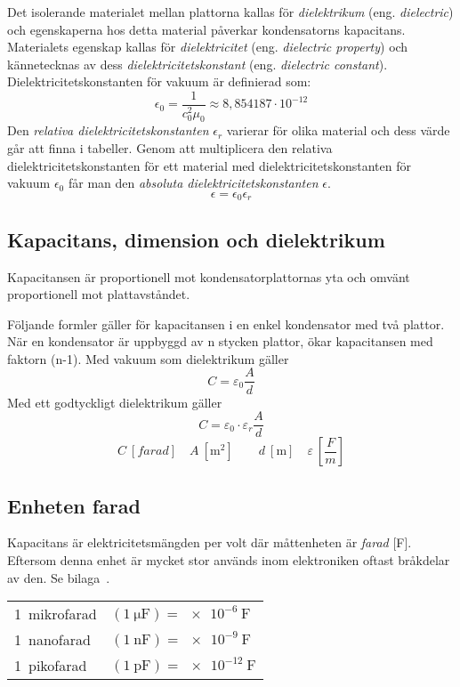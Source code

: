 Det isolerande materialet mellan plattorna kallas för \emph{dielektrikum}
(eng. \emph{dielectric}) och egenskaperna hos detta material påverkar
kondensatorns kapacitans.
Materialets egenskap kallas för \emph{dielektricitet}
(eng. \emph{dielectric property}) och kännetecknas av dess
\emph{dielektricitetskonstant} (eng. \emph{dielectric constant}).
Dielektricitetskonstanten för vakuum är definierad som:
\[\epsilon_0 = \dfrac{1}{c_0^2\mu_0} \approx 8,854187 \cdot 10^{-12}\]
Den \emph{relativa dielektricitetskonstanten} \(\epsilon_r\) varierar för olika
material och dess värde går att finna i tabeller.
Genom att multiplicera den relativa dielektricitetskonstanten för ett material
med dielektricitetskonstanten för vakuum \(\epsilon_0\) får man den
\emph{absoluta dielektricitetskonstanten} \(\epsilon\).
\[\epsilon = \epsilon_0\epsilon_r\]

\subsection{Kapacitans, dimension och dielektrikum}

Kapacitansen är proportionell mot kondensatorplattornas yta och omvänt 
proportionell mot plattavståndet.

Följande formler gäller för kapacitansen i en enkel kondensator med två
plattor. När en kondensator är uppbyggd av n stycken plattor, ökar kapacitansen
med faktorn (n-1).
Med vakuum som dielektrikum gäller
\[C = \varepsilon _0 \dfrac{A}{d}\]
Med ett godtyckligt dielektrikum gäller
\[C = \varepsilon _0 \cdot \varepsilon _r \frac{A}{d}\]
\[C\ [\textit{farad}]\quad A\ [\unit{\metre\squared}]\qquad d\ [\unit{\metre}]\quad \varepsilon\ [\dfrac{F}{m}]\]

\subsection{Enheten farad}

Kapacitans är elektricitetsmängden per volt där måttenheten är \emph{farad} [F].
Eftersom denna enhet är mycket stor används inom elektroniken oftast bråkdelar
av den.
Se bilaga~.

\begin{center}
\begin{tabular}{ll}
1~mikrofarad & \((\qty{1}{\micro\farad}) = \qty{e-6}{\farad}\) \\
1~nanofarad & \((\qty{1}{\nano\farad}) = \qty{e-9}{\farad}\) \\
1~pikofarad & \((\qty{1}{\pico\farad}) = \qty{e-12}{\farad}\) \\
\end{tabular}
\end{center}

